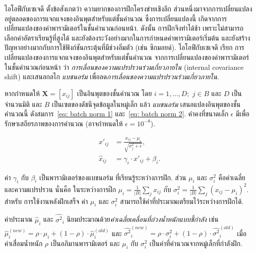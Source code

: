 ไอโอฟีกับเซเจดี\cite{IoffeSzegedy2015a}
ตั้งข้อสังเกตว่า
ความยากของการฝึกโครงข่ายเชิงลึก 
ส่วนหนึ่งมาจากการเปลี่ยนแปลงอยู่ตลอดของการแจกแจงของอินพุตสำหรับแต่ชั้นคำนวณ
ซึ่งการเปลี่ยนแปลงนี้ เกิดจากการเปลี่ยนแปลงของค่าพารามิเตอร์ในชั้นคำนวณก่อนหน้า.
ดังนั้น การฝึกจึงทำได้ช้า 
เพราะไม่สามารถเลือกค่าอัตราเรียนรู้ที่สูงได้
และยังต้องระวังอย่างมากในการกำหนดค่าพารามิเตอร์เริ่มต้น
และยังสร้างปัญหาอย่างมากกับการใช้ฟังก์ชันกระตุ้นที่มีช่วงอิ่มตัว (เช่น ซิกมอยด์).
ไอโอฟีกับเซเจดี เรียก 
การเปลี่ยนแปลงของการแจกแจงของอินพุตสำหรับแต่ชั้นคำนวณ
จากการเปลี่ยนแปลงของค่าพารามิเตอร์ในชั้นคำนวณก่อนหน้า
ว่า \textit{การเลื่อนของความแปรปรวนร่วมเกี่ยวภายใน} (internal covariance shift)
และเสนอกลไก \textit{แบชนอร์ม} เพื่อลด\textit{การเลื่อนของความแปรปรวนร่วมเกี่ยวภายใน}.

หากกำหนดให้ $\bm{X} = [x_{ij}]$ เป็นอินพุตของชั้นคำนวณ
โดย $i = 1, \ldots, D;$ $j \in B$
และ $D$ เป็นจำนวนมิติ และ $B$ เป็นเซตของดัชนีจุดข้อมูลในหมู่เล็ก
แล้ว \textit{แบชนอร์ม} เสนอแปลงอินพุตของชั้นคำนวณนี้
ดังสมการ~\ref{eq: batch norm 1} และ~\ref{eq: batch norm 2}.
ค่าคงที่ขนาดเล็ก $\epsilon$ มีเพื่อรักษาเสถียรภาพของการคำนวณ (อาจกำหนดให้ $\epsilon = 10^{-8}$).

\begin{align}
x'_{ij} &= \frac{x_{ij} - \mu_i}{ \sqrt{\sigma_j^2 + \epsilon}}
\label{eq: batch norm 1} , \\
\hat{x}_{ij} &= \gamma_i \cdot x'_{ij} + \beta_i
\label{eq: batch norm 2}.
\end{align}

ค่า $\gamma_i$ กับ $\beta_i$ เป็นพารามิเตอร์ของแบชนอร์ม ที่เรียนรู้ระหว่างการฝึก.
ส่วน $\mu_i$ และ $\sigma_i^2$ 
คือค่าเฉลี่ยและความแปรปรวน
นั่นคือ ในระหว่างการฝึก 
$\mu_i = \frac{1}{|B|}\sum_j x_{ij}$
กับ $\sigma_i^2 = \frac{1}{|B|}\sum_j (x_{ij} - \mu_i)^2$.
สำหรับ การใช้งานหลังฝึกเสร็จ
ค่า $\mu_i$ และ $\sigma_i^2$ 
สามารถใช้ค่าที่ประมาณเตรียมไว้ระหว่างการฝึกได้.

ค่าประมาณ 
$\hat{\mu}_i$ และ 
$\hat{\sigma^2}_i$ 
นิยมประมาณด้วย\textit{ค่าเฉลี่ยเคลื่อนที่ถ่วงน้ำหนักแบบชี้กำลัง}
เช่น
$\hat{\mu}_i^{(new)} = \rho \cdot \mu_i
+ (1-\rho) \cdot \hat{\mu}_i^{(old)}$
และ
$\hat{\sigma^2}_i^{(new)} = \rho \cdot \sigma^2_i
+ (1-\rho) \cdot \hat{\sigma^2}_i^{(old)}$
เมื่อ ค่าเสื่อมน้ำหนัก $\rho$ เป็นอภิมานพารามิเตอร์ 
และ
$\mu_i$ กับ $\sigma_i^2$
เป็นค่าที่คำนวณจากหมู่เล็กที่กำลังฝึก.

